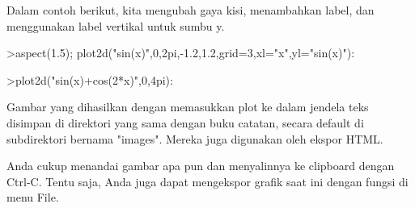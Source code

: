 \documentclass[a4paper,10pt]{article}
\begin{document}
\begin{eulernotebook}
\begin{eulercomment}
\begin{eulercomment}
\begin{eulercomment}
\begin{eulercomment}
\begin{eulercomment}
Dalam contoh berikut, kita mengubah gaya kisi, menambahkan label, dan
menggunakan label vertikal untuk sumbu y.
\end{eulercomment}
\begin{eulerprompt}
>aspect(1.5); plot2d("sin(x)",0,2pi,-1.2,1.2,grid=3,xl="x",yl="sin(x)"):
\end{eulerprompt}
\begin{eulerprompt}
>plot2d("sin(x)+cos(2*x)",0,4pi):
\end{eulerprompt}
\begin{eulercomment}
Gambar yang dihasilkan dengan memasukkan plot ke dalam jendela teks
disimpan di direktori yang sama dengan buku catatan, secara default di
subdirektori bernama "images". Mereka juga digunakan oleh ekspor HTML.

Anda cukup menandai gambar apa pun dan menyalinnya ke clipboard dengan
Ctrl-C. Tentu saja, Anda juga dapat mengekspor grafik saat ini dengan
fungsi di menu File.


\end{eulercomment}
\end{eulercomment}
\end{eulercomment}
\end{eulercomment}
\end{eulercomment}
\end{eulernotebook}
\end{document}
